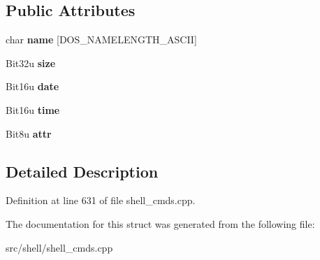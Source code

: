 \subsection*{Public Attributes}
\begin{DoxyCompactItemize}
\item 
\hypertarget{structDtaResult_a35acc0819ed5d484ae67b0a150702e65}{char {\bfseries name} \mbox{[}D\-O\-S\-\_\-\-N\-A\-M\-E\-L\-E\-N\-G\-T\-H\-\_\-\-A\-S\-C\-I\-I\mbox{]}}\label{structDtaResult_a35acc0819ed5d484ae67b0a150702e65}

\item 
\hypertarget{structDtaResult_ae204e54f6811d77f19876e6b7856ca58}{Bit32u {\bfseries size}}\label{structDtaResult_ae204e54f6811d77f19876e6b7856ca58}

\item 
\hypertarget{structDtaResult_ab6706554a1f9124eaf932dfff90dc962}{Bit16u {\bfseries date}}\label{structDtaResult_ab6706554a1f9124eaf932dfff90dc962}

\item 
\hypertarget{structDtaResult_a654e696728853f730e909750a2b35932}{Bit16u {\bfseries time}}\label{structDtaResult_a654e696728853f730e909750a2b35932}

\item 
\hypertarget{structDtaResult_a01eb3c4fe466f291e8ffd3d788ee9d6c}{Bit8u {\bfseries attr}}\label{structDtaResult_a01eb3c4fe466f291e8ffd3d788ee9d6c}

\end{DoxyCompactItemize}


\subsection{Detailed Description}


Definition at line 631 of file shell\-\_\-cmds.\-cpp.



The documentation for this struct was generated from the following file\-:\begin{DoxyCompactItemize}
\item 
src/shell/shell\-\_\-cmds.\-cpp\end{DoxyCompactItemize}
